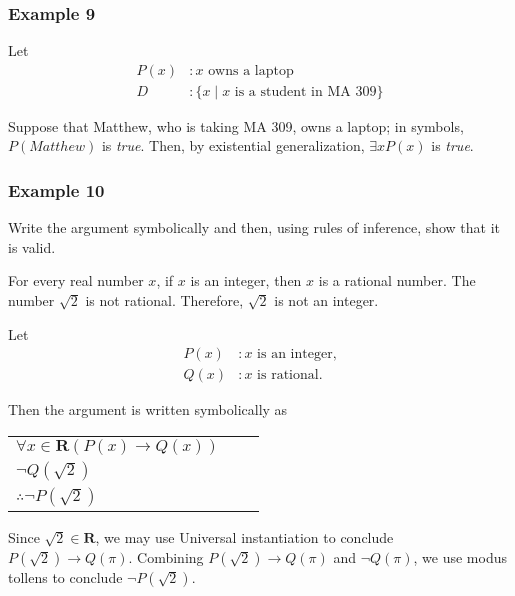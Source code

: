 \subsubsection{Example 9}

Let
\begin{align*}
P(x)&: x \text{ owns a laptop}\\
D&: \{x \mid x \text{ is a student in MA 309}\}
\end{align*}

Suppose that Matthew, who is taking MA 309, owns a laptop; in symbols, $P(Matthew)$ is \textit{true}.  Then, by existential generalization, $\exists x P(x)$ is \textit{true}.

\subsubsection{Example 10}

Write the argument symbolically and then, using rules of inference, show that it is valid.
\begin{center}
    For every real number $x$, if $x$ is an integer, then $x$ is a rational number.  The number $\sqrt{2}$ is not rational.  Therefore, $\sqrt{2}$ is not an integer.
\end{center}

\clearpage

Let
\begin{align*}
P(x)&: x \text{ is an integer,}\\
Q(x)&: x \text{ is rational.}
\end{align*}

Then the argument is written symbolically as 

\begin{table}[h]
\centering
\begin{tabular}{l@{\,}l@{\,}l@{\,}}
  $\forall x \in \textbf{R}(P(x) \rightarrow Q(x))$ & & \\
  $\lnot Q(\sqrt{2})$ & & \\
\hline
 $\therefore \lnot P(\sqrt{2}) $ & &
\end{tabular}
\end{table}

Since $\sqrt{2} \in \textbf{R}$, we may use Universal instantiation to conclude $P(\sqrt{2}) \rightarrow Q(\pi)$.  Combining $P(\sqrt{2}) \rightarrow Q(\pi)$ and $\lnot Q(\pi)$, we use modus tollens to conclude $\lnot P(\sqrt{2})$.






